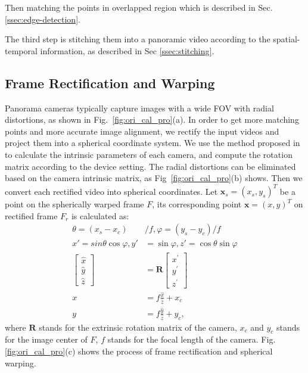 \documentclass[conference]{IEEEtran}
\begin{document}
Then matching the points in overlapped region which is described in Sec. \ref{ssec:edge-detection}. 

The third step is stitching them into a panoramic video according to the spatial-temporal information, as described in Sec \ref{ssec:stitching}.

\subsection{Frame Rectification and Warping}
\label{ssec:Pre-prepared}

Panorama cameras typically capture images with a wide FOV with radial distortions, as shown in Fig.~\ref{fig:ori_cal_pro}(a).
In order to get more matching points and more accurate image alignment, we rectify the input videos and project them into a spherical coordinate system.
We use the method proposed in \cite{zhang2000flexible} to calculate the intrinsic parameters of each camera, and compute the rotation matrix according to the device setting. 
%
The radial distortions can be eliminated based on the camera intrinsic matrix, as Fig~\ref{fig:ori_cal_pro}(b) shows.
%
Then we convert each rectified video into spherical coordinates.
Let $\mathbf{x}_{s} = (x_{s},y_{s})^T$ be a point on the spherically
warped frame $F$, its corresponding point $\mathbf{x} = (x, y)^T$ on rectified frame $F_r$ is calculated as:
\begin{equation}
\begin{aligned}
\theta =\left(x_{s}-x_{c}\right) &/ f , \varphi =\left(y_{s} -y_{c}\right) / f \\
x'=sin\theta \cos\varphi, y'&=\sin\varphi, z'=\cos\theta \sin\varphi \\
\left[ \begin{array}{l}{\hat{x}} \\ {\hat{y}} \\ {\hat{z}}\end{array}\right]&=\textbf{R} \left[ \begin{array}{l}{x^{\prime}} \\ {y^{\prime}} \\ {z^{\prime}}\end{array}\right]\\
x&=f\frac{\hat{x}}{\hat{z}}+x_c\\
y&=f\frac{\hat{y}}{\hat{z}}+y_c,
\end{aligned}
\end{equation}
where $\textbf{R}$ stands for the extrinsic rotation matrix of the camera, $x_c$ and $y_c$ stands for the image center of $F$, $f$ stands for the focal length of the camera.
Fig. \ref{fig:ori_cal_pro}(c) shows the process of frame rectification and spherical warping. 
\end{document}
